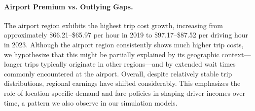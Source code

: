\paragraph{\textbf{Airport Premium vs. Outlying Gaps.}}
The airport region exhibits the highest trip cost growth, increasing from approximately \$66.21--\$65.97 per hour in 2019 to \$97.17--\$87.52 per driving hour in 2023. Although the airport region consistently shows much higher trip costs, we hypothesize that this might be partially explained by its geographic context---longer trips typically originate in other regions---and by extended wait times commonly encountered at the airport. 
Overall, despite relatively stable trip distributions, regional earnings have shifted considerably. This emphasizes the role of location-specific demand and fare policies in shaping driver incomes over time, a pattern we also observe in our simulation models.



